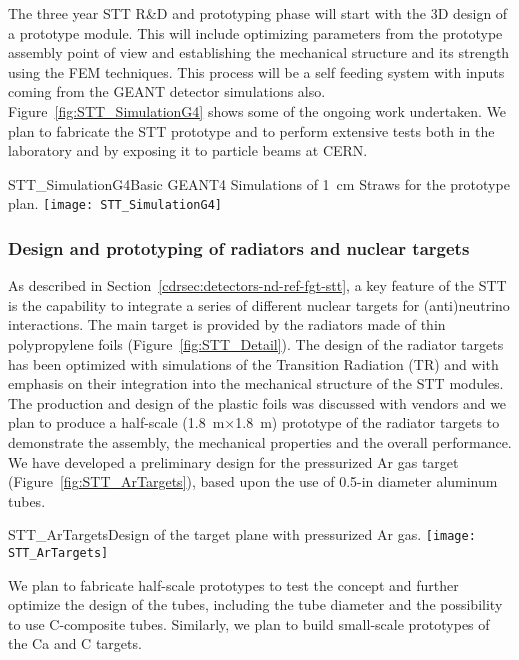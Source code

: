 The three year STT R\&D and prototyping phase will start with the 3D
design of a prototype module.  This will include optimizing 
parameters from the prototype assembly point of view and
establishing the mechanical structure and its strength using the FEM
techniques. This process will be a self feeding system with inputs
coming from the GEANT detector simulations also.
Figure~\ref{fig:STT_SimulationG4} shows some of the ongoing work
undertaken. We plan to fabricate the STT prototype and to perform
extensive tests both in the laboratory and by exposing it to particle
beams at CERN.

\begin{cdrfigure} 
{STT_SimulationG4}{Basic GEANT4 Simulations of 1~cm Straws for the prototype plan.}
\texttt{[image: STT\_SimulationG4]}
\end{cdrfigure}


\subsubsection{Design and prototyping of radiators and nuclear targets} 

As described in Section~\ref{cdrsec:detectors-nd-ref-fgt-stt}, a key
feature of the STT is the capability to integrate a series of
different nuclear targets for (anti)neutrino interactions.  The main
target is provided by the radiators made of thin polypropylene foils
(Figure~\ref{fig:STT_Detail}).  The design of the radiator targets has
been optimized with simulations of the Transition Radiation (TR) and
with emphasis on their integration into the mechanical structure of
the STT modules.  The production and design of the plastic foils was
discussed with vendors and we plan to produce a half-scale
(1.8~m$\times$1.8~m) prototype of the radiator targets to demonstrate
the assembly, the mechanical properties and the overall
performance. We have developed a preliminary design for the
pressurized Ar gas target (Figure~\ref{fig:STT_ArTargets}), based upon
the use of 0.5-in diameter aluminum tubes.  
\begin{cdrfigure} 
{STT_ArTargets}{Design of the target plane with pressurized Ar gas.}
\texttt{[image: STT\_ArTargets]}
\end{cdrfigure}
We plan to fabricate half-scale prototypes to test the concept and
further optimize the design of the tubes, including the tube diameter
and the possibility to use C-composite tubes.  Similarly, we plan to
build small-scale prototypes of the Ca and C targets.


